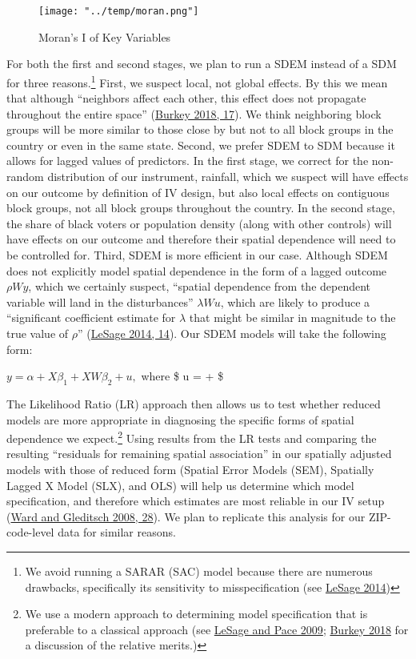\documentclass[
  12pt,
]{article}
\begin{document}
\begin{figure}
\hypertarget{tab:moran}{%
\centering
\texttt{[image: "../temp/moran.png"]}
\caption{Moran's I of Key Variables}\label{tab:moran}
}
\end{figure}

For both the first and second stages, we plan to run a SDEM instead of a SDM for three reasons.\footnote{We avoid running a SARAR (SAC) model because there are numerous drawbacks, specifically its sensitivity to misspecification (see \protect\hyperlink{ref-LeSage2014}{LeSage 2014})} First, we suspect local, not global effects. By this we mean that although ``neighbors affect each other, this effect does not propagate throughout the entire space'' (\protect\hyperlink{ref-Burkey2018}{Burkey 2018, 17}). We think neighboring block groups will be more similar to those close by but not to all block groups in the country or even in the same state. Second, we prefer SDEM to SDM because it allows for lagged values of predictors. In the first stage, we correct for the non-random distribution of our instrument, rainfall, which we suspect will have effects on our outcome by definition of IV design, but also local effects on contiguous block groups, not all block groups throughout the country. In the second stage, the share of black voters or population density (along with other controls) will have effects on our outcome and therefore their spatial dependence will need to be controlled for. Third, SDEM is more efficient in our case. Although SDEM does not explicitly model spatial dependence in the form of a lagged outcome \(\rho{Wy}\), which we certainly suspect, ``spatial dependence from the dependent variable will land in the disturbances'' \(\lambda{Wu}\), which are likely to produce a ``significant coefficient estimate for \(\lambda\) that might be similar in magnitude to the true value of \(\rho\)'' (\protect\hyperlink{ref-LeSage2014}{LeSage 2014, 14}). Our SDEM models will take the following form:

\(y = \alpha{} + X\beta_1{} + XW\beta_2{} + u,\) where \$ u =  + \epsilon{}\$

The Likelihood Ratio (LR) approach then allows us to test whether reduced models are more appropriate in diagnosing the specific forms of spatial dependence we expect.\footnote{We use a modern approach to determining model specification that is preferable to a classical approach (see \protect\hyperlink{ref-LeSage2009}{LeSage and Pace 2009}; \protect\hyperlink{ref-Burkey2018}{Burkey 2018} for a discussion of the relative merits.)} Using results from the LR tests and comparing the resulting ``residuals for remaining spatial association'' in our spatially adjusted models with those of reduced form (Spatial Error Models (SEM), Spatially Lagged X Model (SLX), and OLS) will help us determine which model specification, and therefore which estimates are most reliable in our IV setup (\protect\hyperlink{ref-Ward2008}{Ward and Gleditsch 2008, 28}). We plan to replicate this analysis for our ZIP-code-level data for similar reasons.
\end{document}
